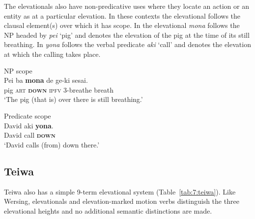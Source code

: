   



   

The elevationals also have non-predicative uses where they locate an action or an entity as at a particular elevation. In these contexts the elevational follows the clausal element(s) over which it has scope. In  the elevational \textit{mona} follows the NP headed by \textit{pei} `pig' and denotes the elevation of the pig at the time of its still breathing. In  \textit{yona} follows the verbal predicate \textit{aki} `call' and denotes the elevation at which the calling takes place. 


\ea%
\label{ex:7:4}
\upshape
 NP scope
 \\
\gll   Pei   ba            \textbf{{mona}}      de                       ge-ki{\ng}  sesai.\\
       pig  \textsc{art} \textbf{\textsc{down}} \textsc{ipfv} \textsc{3-}breathe  breath \\
\glt  `The pig (that is) over there is still breathing.'
\z

 

 



\ea%
\label{ex:7:5}
\upshape
Predicate scope    
 \\
\gll David   aki  \textbf{{yona}}{.} \\
       David  call  \textbf{\textsc{down}} \\
\glt `David calls (from) down there.'
\z

  

 

 

\subsection{Teiwa}
Teiwa also has a simple 9-term elevational system (Table~\ref{tab:7:teiwa}). Like Wersing, elevationals and elevation-marked motion verbs distinguish the three elevational heights and no additional semantic distinctions are made.

